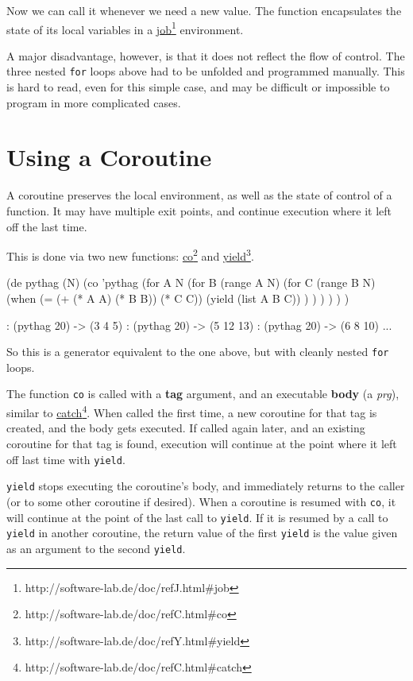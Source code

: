 Now we can call it whenever we need a new value. The function encapsulates the
state of its local variables in a \underline{job}\footnote{http://software-lab.de/doc/refJ.html\#job} environment.

A major disadvantage, however, is that it does not reflect the flow of control.
The three nested \texttt{for} loops above had to be unfolded and programmed manually.
This is hard to read, even for this simple case, and may be difficult or
impossible to program in more complicated cases.

\section{Using a Coroutine}
\label{sec:coroutines-using-a-coroutine}

A coroutine preserves the local environment, as well as the state of control of
a function. It may have multiple exit points, and continue execution where it
left off the last time.

This is done via two new functions: \underline{co}\footnote{http://software-lab.de/doc/refC.html\#co} and \underline{yield}\footnote{http://software-lab.de/doc/refY.html\#yield}.
\begin{wideverbatim}
   (de pythag (N)
      (co 'pythag
         (for A N
            (for B (range A N)
               (for C (range B N)
                  (when (= (+ (* A A) (* B B)) (* C C))
                     (yield (list A B C)) ) ) ) ) ) )

   : (pythag 20)
   -> (3 4 5)
   : (pythag 20)
   -> (5 12 13)
   : (pythag 20)
   -> (6 8 10)
   ...
\end{wideverbatim}

So this is a generator equivalent to the one above, but with cleanly nested
\texttt{for} loops.

The function \texttt{co} is called with a \textbf{tag} argument, and an executable \textbf{body}
(a \textit{prg}), similar to \underline{catch}\footnote{http://software-lab.de/doc/refC.html\#catch}. When
called the first time, a new coroutine for that tag is created, and the body
gets executed. If called again later, and an existing coroutine for that tag is
found, execution will continue at the point where it left off last time with
\texttt{yield}.

\texttt{yield} stops executing the coroutine's body, and immediately returns to the
caller (or to some other coroutine if desired). When a coroutine is resumed with
\texttt{co}, it will continue at the point of the last call to \texttt{yield}. If it is
resumed by a call to \texttt{yield} in another coroutine, the return value of the
first \texttt{yield} is the value given as an argument to the second \texttt{yield}.

